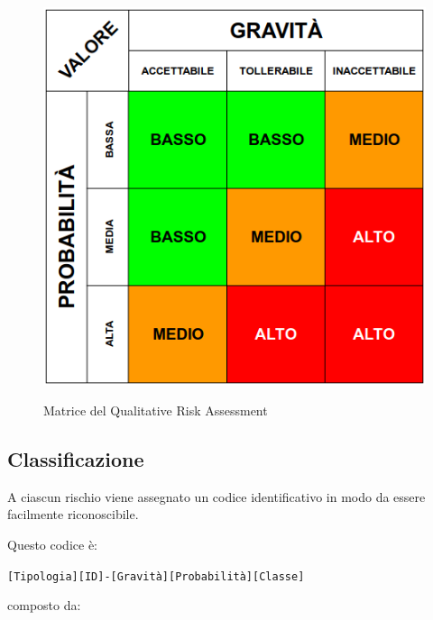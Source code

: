 	\begin{figure}[H]
		\centering
		\includegraphics[scale=0.5]{img/risk_assessment_table.png}\\
		\caption{Matrice del Qualitative Risk Assessment}
	\end{figure}

	\subsection{Classificazione}

	A ciascun rischio viene assegnato un codice identificativo in modo da essere facilmente riconoscibile.
	
	Questo codice è:

	\begin{center}
		\texttt{[Tipologia][ID]-[Gravità][Probabilità][Classe]}
	\end{center}

	composto da:
	
